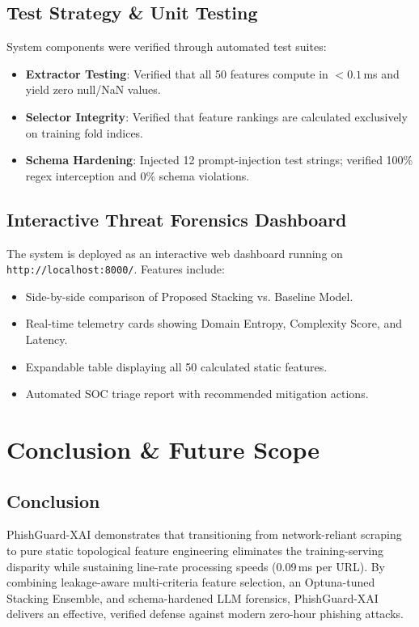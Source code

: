 \documentclass[12pt,a4paper,oneside]{report}
\begin{document}
\section{Test Strategy \& Unit Testing}
System components were verified through automated test suites:
\begin{itemize}
    \item \textbf{Extractor Testing}: Verified that all 50 features compute in $< 0.1$\,ms and yield zero null/NaN values.
    \item \textbf{Selector Integrity}: Verified that feature rankings are calculated exclusively on training fold indices.
    \item \textbf{Schema Hardening}: Injected 12 prompt-injection test strings; verified 100\% regex interception and 0\% schema violations.
\end{itemize}

\section{Interactive Threat Forensics Dashboard}
The system is deployed as an interactive web dashboard running on \texttt{http://localhost:8000/}. Features include:
\begin{itemize}
    \item Side-by-side comparison of Proposed Stacking vs. Baseline Model.
    \item Real-time telemetry cards showing Domain Entropy, Complexity Score, and Latency.
    \item Expandable table displaying all 50 calculated static features.
    \item Automated SOC triage report with recommended mitigation actions.
\end{itemize}

\chapter{Conclusion \& Future Scope}

\section{Conclusion}
PhishGuard-XAI demonstrates that transitioning from network-reliant scraping to pure static topological feature engineering eliminates the training-serving disparity while sustaining line-rate processing speeds (0.09\,ms per URL). By combining leakage-aware multi-criteria feature selection, an Optuna-tuned Stacking Ensemble, and schema-hardened LLM forensics, PhishGuard-XAI delivers an effective, verified defense against modern zero-hour phishing attacks.
\end{document}
